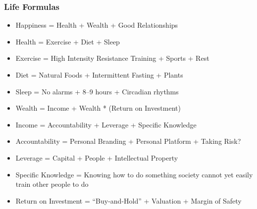 \begin{frame}[fragile]\frametitle{Life Formulas}

	\begin{itemize}

	\item Happiness = Health + Wealth + Good Relationships 
\item Health = Exercise + Diet + Sleep 
\item Exercise = High Intensity Resistance Training + Sports + Rest 
\item Diet = Natural Foods + Intermittent Fasting + Plants 
\item Sleep = No alarms + 8–9 hours + Circadian rhythms 
\item Wealth = Income + Wealth * (Return on Investment) 
\item Income = Accountability + Leverage + Specific Knowledge 
\item Accountability = Personal Branding + Personal Platform + Taking Risk? 
\item Leverage = Capital + People + Intellectual Property 
\item Specific Knowledge = Knowing how to do something society cannot yet easily train other people to do 
\item Return on Investment = ``Buy-and-Hold'' + Valuation + Margin of Safety
	\end{itemize}

\end{frame}

